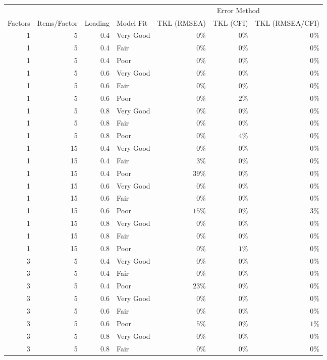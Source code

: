 \captionsetup[table]{labelformat=empty}
\begin{longtable}{rrrlrrr}
\toprule
 &  &  &  & \multicolumn{3}{c}{Error Method} \\ 
 \cmidrule(lr){5-7}
Factors & Items/Factor & Loading & Model Fit & TKL (RMSEA) & TKL (CFI) & TKL (RMSEA/CFI) \\ 
\midrule
1 & 5 & 0.4 & Very Good & $0\%$ & $0\%$ & $0\%$ \\ 
1 & 5 & 0.4 & Fair & $0\%$ & $0\%$ & $0\%$ \\ 
1 & 5 & 0.4 & Poor & $0\%$ & $0\%$ & $0\%$ \\ 
1 & 5 & 0.6 & Very Good & $0\%$ & $0\%$ & $0\%$ \\ 
1 & 5 & 0.6 & Fair & $0\%$ & $0\%$ & $0\%$ \\ 
1 & 5 & 0.6 & Poor & $0\%$ & $2\%$ & $0\%$ \\ 
1 & 5 & 0.8 & Very Good & $0\%$ & $0\%$ & $0\%$ \\ 
1 & 5 & 0.8 & Fair & $0\%$ & $0\%$ & $0\%$ \\ 
1 & 5 & 0.8 & Poor & $0\%$ & $4\%$ & $0\%$ \\ 
1 & 15 & 0.4 & Very Good & $0\%$ & $0\%$ & $0\%$ \\ 
1 & 15 & 0.4 & Fair & $3\%$ & $0\%$ & $0\%$ \\ 
1 & 15 & 0.4 & Poor & $39\%$ & $0\%$ & $0\%$ \\ 
1 & 15 & 0.6 & Very Good & $0\%$ & $0\%$ & $0\%$ \\ 
1 & 15 & 0.6 & Fair & $0\%$ & $0\%$ & $0\%$ \\ 
1 & 15 & 0.6 & Poor & $15\%$ & $0\%$ & $3\%$ \\ 
1 & 15 & 0.8 & Very Good & $0\%$ & $0\%$ & $0\%$ \\ 
1 & 15 & 0.8 & Fair & $0\%$ & $0\%$ & $0\%$ \\ 
1 & 15 & 0.8 & Poor & $0\%$ & $1\%$ & $0\%$ \\ 
3 & 5 & 0.4 & Very Good & $0\%$ & $0\%$ & $0\%$ \\ 
3 & 5 & 0.4 & Fair & $0\%$ & $0\%$ & $0\%$ \\ 
3 & 5 & 0.4 & Poor & $23\%$ & $0\%$ & $0\%$ \\ 
3 & 5 & 0.6 & Very Good & $0\%$ & $0\%$ & $0\%$ \\ 
3 & 5 & 0.6 & Fair & $0\%$ & $0\%$ & $0\%$ \\ 
3 & 5 & 0.6 & Poor & $5\%$ & $0\%$ & $1\%$ \\ 
3 & 5 & 0.8 & Very Good & $0\%$ & $0\%$ & $0\%$ \\ 
3 & 5 & 0.8 & Fair & $0\%$ & $0\%$ & $0\%$ \\ 

\end{longtable}
